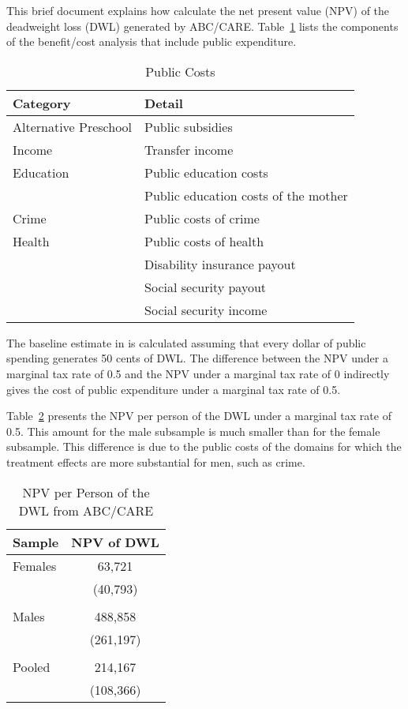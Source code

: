 



\doublespacing

This brief document explains how \citet{Garcia_etal_2016_Comp_CBA_Unpublished} calculate the net present value (NPV) of the deadweight loss (DWL) generated by ABC/CARE. Table~\ref{tab:dwl-componets} lists the components of the benefit/cost analysis that include public expenditure.

\begin{table}[htbp]
\centering
\caption{Public Costs}\label{tab:dwl-componets}
\begin{tabular}{ll}
\toprule
Category & Detail \\
\midrule
Alternative Preschool & Public subsidies \\
Income & Transfer income \\
Education & Public education costs  \\
& Public education costs of the mother \\
Crime & Public costs of crime \\
Health & Public costs of health \\
&Disability insurance payout \\
&Social security payout \\
&Social security income \\
\bottomrule
\end{tabular}
\end{table}

The baseline estimate in \citet{Garcia_etal_2016_Comp_CBA_Unpublished} is calculated assuming that every dollar of public spending generates 50 cents of DWL. The difference between the NPV under a marginal tax rate of 0.5 and the NPV under a marginal tax rate of 0 indirectly gives the cost of public expenditure under a marginal tax rate of 0.5. 

Table~\ref{tab:dwl-npv-rslts} presents the NPV per person of the DWL under a marginal tax rate of 0.5. This amount for the male subsample is much smaller than for the female subsample. This difference is due to the public costs of the domains for which the treatment effects are more substantial for men, such as crime. 

\begin{table}[htbp]
\centering
\caption{NPV per Person of the DWL from ABC/CARE}\label{tab:dwl-npv-rslts}
\begin{tabular}{l c }
\toprule
Sample & NPV of DWL \\
\midrule
Females 	& 	63,721		\\
		&  	(40,793)		\\ \\
Males 	&	488,858		\\
		& 	(261,197)		\\ \\
Pooled 	&	214,167  		\\
		&	(108,366) 		\\
\bottomrule
\end{tabular}
\end{table}

\pagebreak
\singlespace



